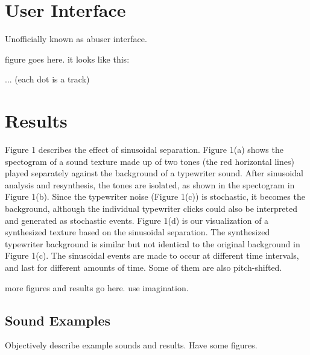 \documentclass{acmsiggraph}               %
\begin{document}
\section{User Interface}

Unofficially known as abuser interface.

figure goes here.  it looks like this:

... (each dot is a track)

\section{Results}

Figure 1 describes the effect of sinusoidal separation. Figure 1(a) shows 
the spectogram of a sound texture made up of two tones (the red 
horizontal lines) played separately against the background of a typewriter 
sound. After sinusoidal analysis and resynthesis, the tones are isolated, 
as shown in the spectogram in Figure 1(b). Since the typewriter noise 
(Figure 1(c)) is stochastic, it becomes the background, although the 
individual typewriter clicks could also be interpreted and generated as 
stochastic events. Figure 1(d) is our visualization of a synthesized 
texture based on the sinusoidal separation. The synthesized typewriter 
background is similar but not identical to the original background in 
Figure 1(c). The sinusoidal events are made to occur at different time 
intervals, and last for different amounts of time. Some of them are also 
pitch-shifted.

more figures and results go here.  use imagination.

\subsection{Sound Examples}
Objectively describe example sounds and results. Have some figures. 

\end{document}
